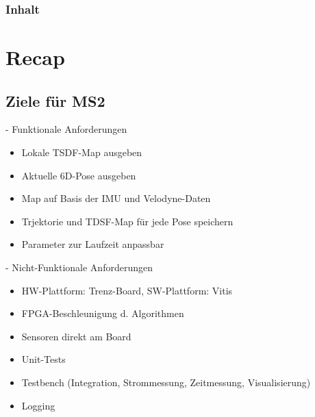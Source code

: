 \documentclass{beamer}
\begin{document}
{
\begin{frame}
\titlepage
\end{frame}}

\begin{frame}
\frametitle{Inhalt}
\tableofcontents
\end{frame}

\section{Recap}
\begin{frame}{}
\begin{center}
\end{center}
\end{frame}

\subsection{Ziele für MS2}
\begin{frame}{\subsecname - Funktionale Anforderungen}
\begin{itemize}
\item{Lokale TSDF-Map ausgeben}
\item{Aktuelle 6D-Pose ausgeben}
\item{Map auf Basis der IMU und Velodyne-Daten}
\item{Trjektorie und TDSF-Map für jede Pose speichern}
\item{Parameter zur Laufzeit anpassbar}
\end{itemize}
\end{frame}
\begin{frame}{\subsecname - Nicht-Funktionale Anforderungen}
\begin{itemize}
\item{HW-Plattform: Trenz-Board, SW-Plattform: Vitis}
\item{FPGA-Beschleunigung d. Algorithmen}
\item{Sensoren direkt am Board}
\item{Unit-Tests}
\item{Testbench (Integration, Strommessung, Zeitmessung, Visualisierung)}
\item{Logging}
\end{itemize}
\end{frame}
\end{document}
